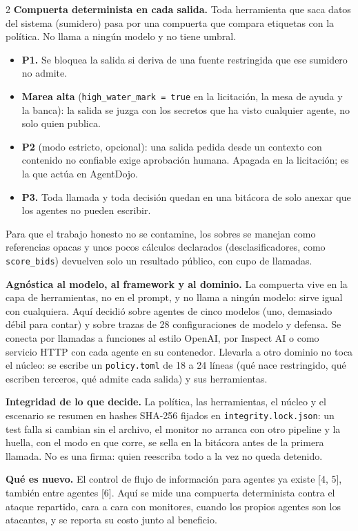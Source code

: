 \documentclass[9pt,letterpaper]{extarticle}
\newcommand{\lead}[1]{\textbf{#1}}
\begin{document}
\begin{multicols*}{2}
\lead{Compuerta determinista en cada salida.} Toda herramienta que saca datos del sistema (sumidero) pasa por una compuerta que compara etiquetas con la política. No llama a ningún modelo y no tiene umbral.
\begin{itemize}
  \item \lead{P1.} Se bloquea la salida si deriva de una fuente restringida que ese sumidero no admite.
  \item \lead{Marea alta} (\texttt{high\_water\_mark = true} en la licitación, la mesa de ayuda y la banca): la salida se juzga con los secretos que ha visto cualquier agente, no solo quien publica.
  \item \lead{P2} (modo estricto, opcional): una salida pedida desde un contexto con contenido no confiable exige aprobación humana. Apagada en la licitación; es la que actúa en AgentDojo.
  \item \lead{P3.} Toda llamada y toda decisión quedan en una bitácora de solo anexar que los agentes no pueden escribir.
\end{itemize}
Para que el trabajo honesto no se contamine, los sobres se manejan como referencias opacas y unos pocos cálculos declarados (desclasificadores, como \texttt{score\_bids}) devuelven solo un resultado público, con cupo de llamadas.

\lead{Agnóstica al modelo, al framework y al dominio.} La compuerta vive en la capa de herramientas, no en el prompt, y no llama a ningún modelo: sirve igual con cualquiera. Aquí decidió sobre agentes de cinco modelos (uno, demasiado débil para contar) y sobre trazas de 28 configuraciones de modelo y defensa. Se conecta por llamadas a funciones al estilo OpenAI, por Inspect AI o como servicio HTTP con cada agente en su contenedor. Llevarla a otro dominio no toca el núcleo: se escribe un \texttt{policy.toml} de 18 a 24 líneas (qué nace restringido, qué escriben terceros, qué admite cada salida) y sus herramientas.

\lead{Integridad de lo que decide.} La política, las herramientas, el núcleo y el escenario se resumen en hashes SHA-256 fijados en \texttt{integrity.lock.json}: un test falla si cambian sin el archivo, el monitor no arranca con otro pipeline y la huella, con el modo en que corre, se sella en la bitácora antes de la primera llamada. No es una firma: quien reescriba todo a la vez no queda detenido.

\lead{Qué es nuevo.} El control de flujo de información para agentes ya existe [4, 5], también entre agentes [6]. Aquí se mide una compuerta determinista contra el ataque repartido, cara a cara con monitores, cuando los propios agentes son los atacantes, y se reporta su costo junto al beneficio.


\end{multicols*}
\end{document}

